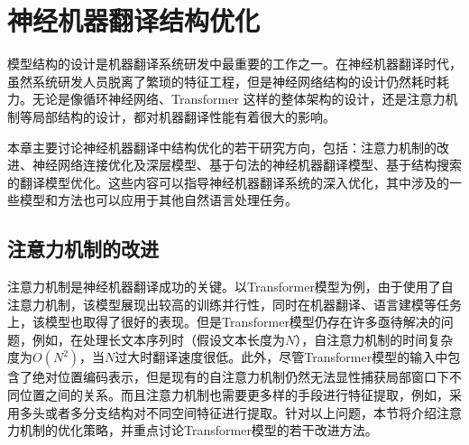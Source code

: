 
%


\renewcommand\figurename{图}%
\renewcommand\tablename{表}%


\chapter{神经机器翻译结构优化}

\parinterval 模型结构的设计是机器翻译系统研发中最重要的工作之一。在神经机器翻译时代，虽然系统研发人员脱离了繁琐的特征工程，但是神经网络结构的设计仍然耗时耗力。无论是像循环神经网络、Transformer 这样的整体架构的设计，还是注意力机制等局部结构的设计，都对机器翻译性能有着很大的影响。

\parinterval 本章主要讨论神经机器翻译中结构优化的若干研究方向，包括：注意力机制的改进、神经网络连接优化及深层模型、基于句法的神经机器翻译模型、基于结构搜索的翻译模型优化。这些内容可以指导神经机器翻译系统的深入优化，其中涉及的一些模型和方法也可以应用于其他自然语言处理任务。


\section{注意力机制的改进}

\parinterval 注意力机制是神经机器翻译成功的关键。以Transformer模型为例，由于使用了自注意力机制，该模型展现出较高的训练并行性，同时在机器翻译、语言建模等任务上，该模型也取得了很好的表现。但是Transformer模型仍存在许多亟待解决的问题，例如，在处理长文本序列时（假设文本长度为$N$），自注意力机制的时间复杂度为$O(N^2)$，当$N$过大时翻译速度很低。此外，尽管Transformer模型的输入中包含了绝对位置编码表示，但是现有的自注意力机制仍然无法显性捕获局部窗口下不同位置之间的关系。而且注意力机制也需要更多样的手段进行特征提取，例如，采用多头或者多分支结构对不同空间特征进行提取。针对以上问题，本节将介绍注意力机制的优化策略，并重点讨论Transformer模型的若干改进方法。


